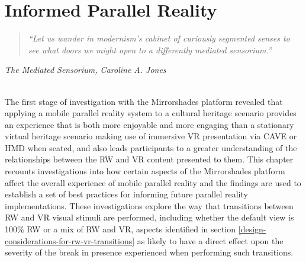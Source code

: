 

\chapter{Informed Parallel Reality}


\begin{quote}
	\textit{``Let us wander in modernism's cabinet of curiously segmented senses to see what doors we might open to a differently mediated sensorium.''}
\end{quote}
\hfill \textit{The Mediated Sensorium, Caroline A. Jones}
\\
\\


\label{chapter-eval-2}

The first stage of investigation with the Mirrorshades platform revealed that applying a mobile parallel reality system to a cultural heritage scenario provides an experience that is both more enjoyable and more engaging than a stationary virtual heritage scenario making use of immersive VR presentation via CAVE or HMD when seated, and also leads participants to a greater understanding of the relationships between the RW and VR content presented to them. This chapter recounts investigations into how certain aspects of the Mirrorshades platform affect the overall experience of mobile parallel reality and the findings are used to establish a set of best practices for informing future parallel reality implementations. These investigations explore the way that transitions between RW and VR visual stimuli are performed, including whether the default view is 100\% RW or a mix of RW and VR, aspects identified in section \ref{design-considerations-for-rw-vr-transitions} as likely to have a direct effect upon the severity of the break in presence experienced when performing such transitions.

